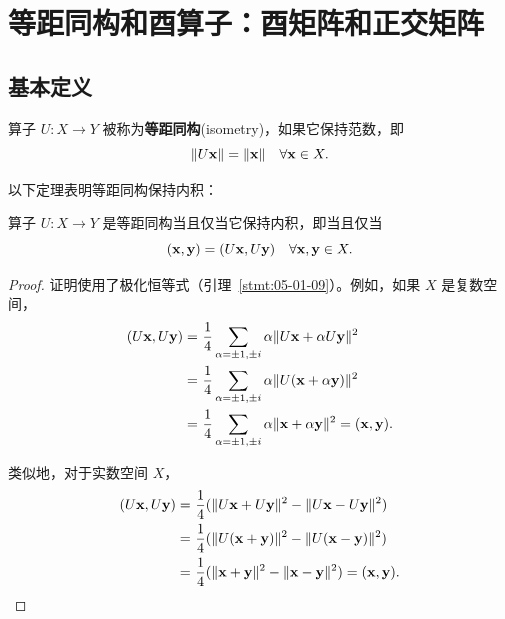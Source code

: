\section{等距同构和酉算子：酉矩阵和正交矩阵}\label{sec:05-06}

\subsection{基本定义}\label{sec:05-06-01}


\begin{definition*}
算子 $U: X \to Y$ 被称为\textbf{等距同构}(isometry)，如果它保持范数，即
$$\|U\mathbf{x}\| = \|\mathbf{x}\| \quad \forall \mathbf{x} \in X.$$
\end{definition*}

以下定理表明等距同构保持内积：

\begin{theorem}\label{stmt:05-06-01} 算子 $U: X \to Y$ 是等距同构当且仅当它保持内积，即当且仅当
$$(\mathbf{x}, \mathbf{y}) = (U\mathbf{x}, U\mathbf{y}) \quad \forall \mathbf{x}, \mathbf{y} \in X.$$\end{theorem}

\begin{proof}证明使用了极化恒等式（引理~\ref{stmt:05-01-09}）。例如，如果 $X$ 是复数空间，
\begin{equation} \notag
\begin{split}
 (U\mathbf{x}, U\mathbf{y})
=&\ \frac{1}{4} \sum_{\alpha = \pm 1, \pm i} \alpha \|U\mathbf{x} + \alpha U\mathbf{y}\|^2      \\
=&\ \frac{1}{4} \sum_{\alpha = \pm 1, \pm i} \alpha \|U(\mathbf{x} + \alpha \mathbf{y})\|^2  \\
=&\ \frac{1}{4} \sum_{\alpha = \pm 1, \pm i} \alpha \|\mathbf{x} + \alpha \mathbf{y}\|^2 = (\mathbf{x}, \mathbf{y}). \\
\end{split}
\end{equation}

类似地，对于实数空间 $X$，
\begin{equation} \notag
\begin{split}
  (U\mathbf{x}, U\mathbf{y})
=&\
 \frac{1}{4} (\|U\mathbf{x} + U\mathbf{y}\|^2 - \|U\mathbf{x} - U\mathbf{y}\|^2)
         \\
=&\   \frac{1}{4} (\|U(\mathbf{x}+\mathbf{y})\|^2 - \|U(\mathbf{x}-\mathbf{y})\|^2)  \\
=&\   \frac{1}{4} (\|\mathbf{x}+\mathbf{y}\|^2 - \|\mathbf{x}-\mathbf{y}\|^2) = (\mathbf{x}, \mathbf{y}). \\
\end{split}
\end{equation}\end{proof}


